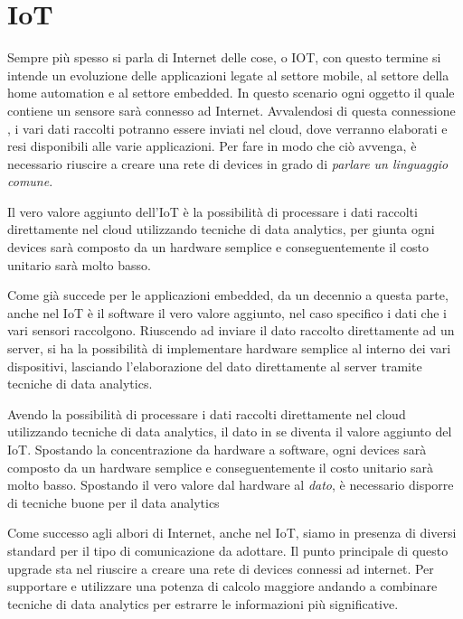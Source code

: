 \chapter{IoT}
Sempre più spesso si parla di Internet delle cose, o IOT, con questo termine si 
intende un evoluzione delle applicazioni legate al settore mobile, al settore
della home automation e al settore embedded. 
In questo scenario ogni oggetto il
quale contiene un sensore sarà connesso ad Internet. Avvalendosi di questa
connessione , i vari dati raccolti potranno essere inviati nel cloud, dove
verranno elaborati e resi disponibili alle varie applicazioni. 
Per fare in modo che ciò  avvenga, è necessario riuscire a creare una
rete di devices in grado di  
\textit{parlare un linguaggio comune}. 

\begin{tcolorbox}
Il vero valore aggiunto dell'IoT è la possibilità di processare i dati raccolti
direttamente nel cloud utilizzando tecniche di data analytics, per giunta
ogni devices sarà composto da un hardware semplice e conseguentemente il costo
unitario sarà molto basso.
\end{tcolorbox}

Come già succede per le applicazioni embedded, da un decennio a questa parte,
anche nel IoT è il software il vero valore aggiunto, nel caso specifico i dati
che i vari sensori raccolgono. Riuscendo ad inviare il dato raccolto
direttamente ad un server, si ha la possibilità di implementare hardware
semplice al interno dei vari dispositivi, lasciando l'elaborazione del dato
direttamente al server tramite tecniche di data analytics.

\begin{tcolorbox}
Avendo la possibilità di processare i dati raccolti
direttamente nel cloud utilizzando tecniche di data analytics, il dato in se
diventa il valore aggiunto del IoT. Spostando la concentrazione da hardware a
software,  ogni devices sarà composto da un hardware semplice e conseguentemente il costo
unitario sarà molto basso.
Spostando il vero valore dal hardware al \emph{dato}, è necessario disporre di
tecniche buone per il data analytics

Come successo agli albori di Internet, anche nel IoT, siamo in presenza di
diversi standard per il tipo di comunicazione da adottare.
Il punto principale di questo
upgrade sta nel riuscire a creare una rete di devices connessi ad internet. Per
supportare e utilizzare una potenza di calcolo maggiore andando a combinare
tecniche di data analytics per estrarre le informazioni più significative. 
\end{tcolorbox}

